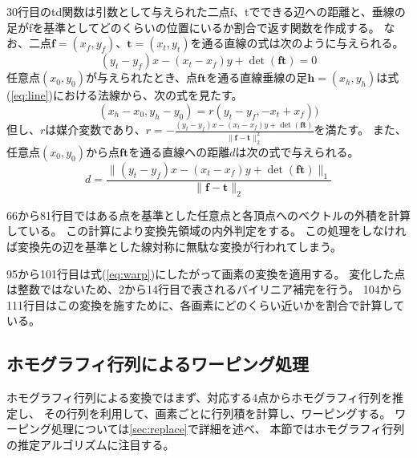 30行目のtd関数は引数として与えられた二点f、tでできる辺への距離と、垂線の足がfを基準としてどのくらいの位置にいるか割合で返す関数を作成する。
なお、二点$\bm{f}=(x_f, y_f)$、$\bm{t}=(x_t, y_t)$を通る直線の式は次のように与えられる。
\begin{equation} \label{eq:line}
(y_t - y_f) x - (x_t - x_f) y + \det{(\bm{f}\bm{t})} = 0
\end{equation}
任意点$(x_0, y_0)$が与えられたとき、点$\bm{ft}$を通る直線垂線の足$\bm{h}=(x_h, y_h)$は式(\ref{eq:line})における法線から、次の式を見たす。
\begin{equation}
(x_h - x_0, y_h - y_0) = r (y_t - y_f, -x_t + x_f))
\end{equation}
但し、$r$は媒介変数であり、$r=-\frac{(y_t - y_f) x - (x_t - x_f) y + \det{(\bm{f}\bm{t})}}{\|\bm{f}-\bm{t}\|_2^2}$を満たす。
また、任意点$(x_0, y_0)$から点$\bm{ft}$を通る直線への距離$d$は次の式で与えられる。
\begin{equation}
d = \frac{\|(y_t - y_f) x - (x_t - x_f) y + \det{(\bm{f}\bm{t})\|_1}}{\|\bm{f}-\bm{t}\|_2}
\end{equation}

66から81行目ではある点を基準とした任意点と各頂点へのベクトルの外積を計算している。
この計算により変換先領域の内外判定をする。
この処理をしなければ変換先の辺を基準とした線対称に無駄な変換が行われてしまう。

95から101行目は式(\ref{eq:warp})にしたがって画素の変換を適用する。
変化した点は整数ではないため、2から14行目で表されるバイリニア補完を行う。
104から111行目はこの変換を施すために、各画素にどのくらい近いかを割合で計算している。

\subsection{ホモグラフィ行列によるワーピング処理}\label{sec:warp}
ホモグラフィ行列による変換ではまず、対応する4点からホモグラフィ行列を推定し、
その行列を利用して、画素ごとに行列積を計算し、ワーピングする。
ワーピング処理については\ref{sec:replace}で詳細を述べ、
本節ではホモグラフィ行列の推定アルゴリズムに注目する。

